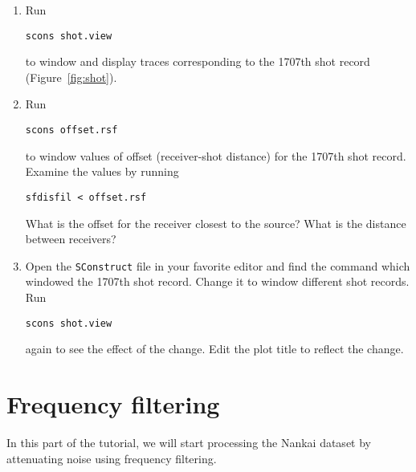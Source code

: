 \begin{enumerate}
\item Run
\begin{verbatim}
scons shot.view
\end{verbatim}
to window and display traces corresponding to the 1707th shot record (Figure~\ref{fig:shot}).
\item Run
\begin{verbatim}
scons offset.rsf
\end{verbatim}
to window values of offset (receiver-shot distance) for the 1707th shot record. Examine the values by running
\begin{verbatim}
sfdisfil < offset.rsf
\end{verbatim}
What is the offset for the receiver closest to the source? What is the distance between receivers? 

\answer{
}       


\item Open the \texttt{SConstruct} file in your favorite editor and find the command which windowed 
the 1707th shot record. Change it to window different shot records. Run
\begin{verbatim}
scons shot.view 
\end{verbatim}
again to see the effect of the change. Edit the plot title to reflect the change.

\end{enumerate}


\section{Frequency filtering}

In this part of the tutorial, we will start processing the Nankai dataset by 
attenuating noise using frequency filtering. 

